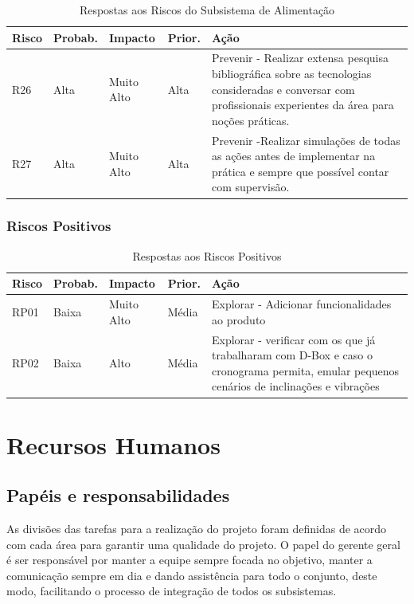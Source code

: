 \begin{table}[H]
\centering
\caption{Respostas aos Riscos do Subsistema de Alimentação}
\label{respostas-riscos-negativos}
\begin{tabular}{|l|l|l|l|p{9cm}|}
\hline
Risco & Probab.    & Impacto    & Prior. & Ação      \\
\hline


R26 & Alta & Muito Alto & Alta & Prevenir - Realizar extensa pesquisa bibliográfica sobre as tecnologias consideradas e conversar com profissionais experientes da área para noções práticas. \\
R27 & Alta & Muito Alto & Alta & Prevenir -Realizar simulações de todas as ações antes de implementar na prática e sempre que possível contar com supervisão. \\

\hline

\end{tabular}
\end{table}

\subsubsection{Riscos Positivos}

\begin{table}[h]
\centering
\caption{Respostas aos Riscos Positivos}
\label{respostas-riscos-positivos}
\begin{tabular}{|l|l|l|l|p{9cm}|}
\hline
Risco & Probab.    & Impacto    & Prior. & Ação      \\
\hline
 
RP01 & Baixa & Muito Alto & Média & Explorar - Adicionar funcionalidades ao produto \\
RP02 & Baixa & Alto & Média & Explorar - verificar com os que já trabalharam com D-Box e caso o cronograma permita, emular pequenos cenários de inclinações e vibrações \\
\hline
\end{tabular}
\end{table}

\section{Recursos Humanos}
\subsection{Papéis e responsabilidades}

	As divisões das tarefas para a realização do projeto foram definidas de acordo com cada área para garantir uma qualidade do projeto. O papel do gerente geral é ser responsável por manter a equipe sempre focada no objetivo, manter a comunicação sempre em dia e dando assistência para todo o conjunto, deste modo, facilitando o processo de integração de todos os subsistemas. 
    
